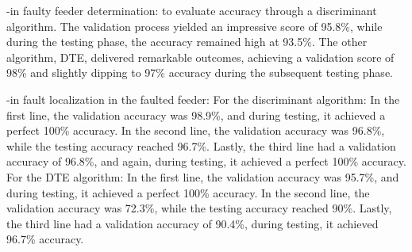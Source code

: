 \documentclass[8pt,a4paper,oneside]{elsarticle}
\begin{document}
-in faulty feeder determination:
to evaluate accuracy through a discriminant algorithm. The validation process yielded an impressive score of 95.8\%, while during the testing phase, the accuracy remained high at 93.5\%. The other algorithm, DTE, delivered remarkable outcomes, achieving a validation score of 98\% and slightly dipping to 97\% accuracy during the subsequent testing phase.

-in fault localization in the faulted feeder:
  For the discriminant algorithm:
In the first line, the validation accuracy was 98.9\%, and during testing, it achieved a perfect 100\% accuracy.
In the second line, the validation accuracy was 96.8\%, while the testing accuracy reached 96.7\%.
Lastly, the third line had a validation accuracy of 96.8\%, and again, during testing, it achieved a perfect 100\% accuracy.
  For the DTE algorithm:
In the first line, the validation accuracy was 95.7\%, and during testing, it achieved a perfect 100\% accuracy.
In the second line, the validation accuracy was 72.3\%, while the testing accuracy reached 90\%.%
Lastly, the third line had a validation accuracy of 90.4\%, during testing, it achieved 96.7\% accuracy.
\end{document}
